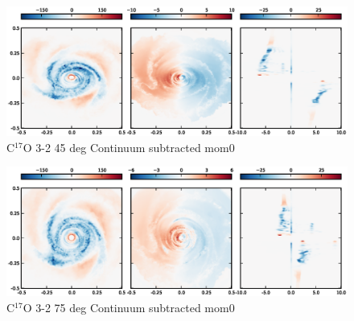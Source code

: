 \documentclass[useAMS,usenatbib]{mn2e}
\begin{document}
\begin{figure}
 \includegraphics[width=198mm]{Figures/sim/imageC17O_3-2_45deg_all.eps}

 \caption{C$^{17}$O 3-2 45 deg Continuum subtracted mom0}
\end{figure}

\begin{figure}
 \includegraphics[width=198mm]{Figures/sim/imageC17O_3-2_75deg_all.eps}

 \caption{C$^{17}$O 3-2 75 deg Continuum subtracted mom0}
\end{figure}

%
%
%
%
%
%
%
\end{document}
